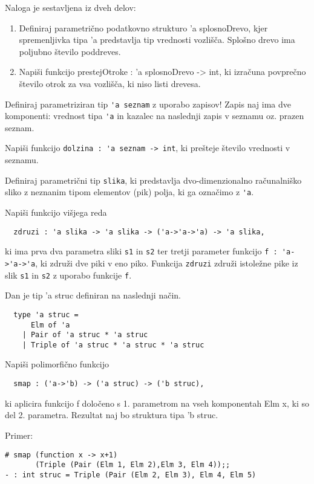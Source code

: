 \begin{ex}
Naloga je sestavljena iz dveh delov:
\begin{enumerate}
    \item Definiraj parametri\v cno podatkovno strukturo 'a splosnoDrevo, kjer spremenljivka tipa 'a predstavlja tip vrednosti vozli\v s\v ca. Splo\v sno drevo ima poljubno \v stevilo poddreves. 
    
    \item Napi\v si funkcijo prestejOtroke : 'a splosnoDrevo -> int, ki izra\v cuna povpre\v cno \v stevilo otrok za vsa vozli\v s\v ca, ki niso listi drevesa.
\end{enumerate}

\end{ex}
\begin{ex}
  Definiraj parametriziran tip \lstinline{'a seznam} z uporabo zapisov!
  Zapis naj ima dve komponenti: vrednost tipa \lstinline{'a} in kazalec na
  naslednji zapis v seznamu oz. prazen seznam.

  Napi\v si funkcijo \lstinline{dolzina : 'a seznam -> int}, ki
  pre\v steje \v stevilo vrednosti v seznamu.


\end{ex} 
\begin{ex}
  Definiraj parametri\v cni tip \lstinline{slika}, ki predstavlja
  dvo-dimenzionalno ra\v cunalni\v sko sliko z neznanim tipom
  elementov (pik) polja, ki ga ozna\v cimo z \lstinline{'a}.

  Napi\v si funkcijo vi\v sjega reda

  \begin{lstlisting}
  zdruzi : 'a slika -> 'a slika -> ('a->'a->'a) -> 'a slika,
  \end{lstlisting}
  ki ima prva dva parametra sliki \lstinline{s1} in \lstinline{s2} ter
  tretji parameter funkcijo \lstinline{f : 'a->'a->'a}, ki zdru\v zi dve
  piki v eno piko. Funkcija \lstinline{zdruzi} zdru\v zi istole\v zne
  pike iz slik \lstinline{s1} in \lstinline{s2} z uporabo funkcije
  \lstinline{f}.


\end{ex} 
\begin{ex}
  Dan je tip 'a struc definiran na naslednji na\v cin.
\begin{lstlisting}
  type 'a struc = 
      Elm of 'a 
    | Pair of 'a struc * 'a struc 
    | Triple of 'a struc * 'a struc * 'a struc
\end{lstlisting}
  Napi\v si polimorfi\v cno funkcijo
\begin{lstlisting}
  smap : ('a->'b) -> ('a struc) -> ('b struc),
\end{lstlisting}
  ki aplicira funkcijo f dolo\v ceno s 1. parametrom na vseh
  komponentah Elm x, ki so del 2. parametra. Rezultat naj bo struktura
  tipa 'b struc.

\noindent\/Primer:            
\begin{lstlisting}
# smap (function x -> x+1) 
       (Triple (Pair (Elm 1, Elm 2),Elm 3, Elm 4));; 
- : int struc = Triple (Pair (Elm 2, Elm 3), Elm 4, Elm 5) 
\end{lstlisting}

\end{ex} 
